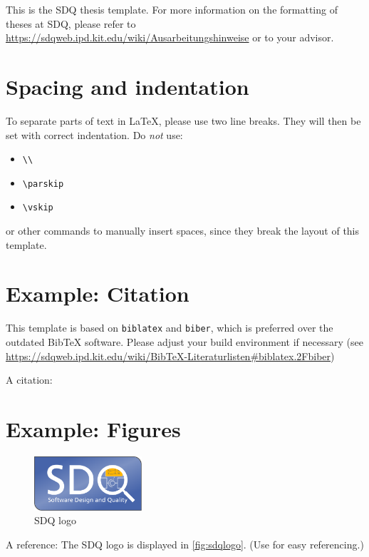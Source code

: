 
This is the SDQ thesis template.
For more information on the formatting of theses at SDQ, please refer to
\url{https://sdqweb.ipd.kit.edu/wiki/Ausarbeitungshinweise} or to your advisor.

\section{Spacing and indentation}
To separate parts of text in \LaTeX, please use two line breaks.
They will then be set with correct indentation.
Do \emph{not} use:
\begin{itemize}
  \itemsep0em
  \item \texttt{\textbackslash\textbackslash}
  \item \texttt{\textbackslash parskip}
  \item \texttt{\textbackslash vskip}
\end{itemize} 
or other commands to manually insert spaces, since they break the layout of this template.

\section{Example: Citation}
\label{sec:Introduction:Citation}
This template is based on \texttt{biblatex} and \texttt{biber}, which is preferred over the
outdated Bib\TeX{} software.
Please adjust your build environment if necessary (see
\url{https://sdqweb.ipd.kit.edu/wiki/BibTeX-Literaturlisten#biblatex.2Fbiber})

A citation: \cite{becker2008a} 

\section{Example: Figures}
\label{sec:Introduction:Figures}
\begin{figure}
\centering
\includegraphics[width=4cm]{logos/sdqlogo}
\caption{SDQ logo}
\label{fig:sdqlogo}
\end{figure}

A reference: The SDQ logo is displayed in \autoref{fig:sdqlogo}. 
(Use  for easy referencing.) 

